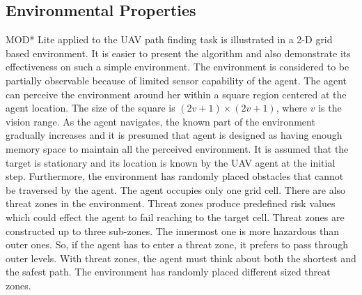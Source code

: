 \documentclass[10pt,journal]{IEEEtran}
\begin{document}
\subsection{Environmental Properties}
\label{envProperties}
MOD* Lite applied to the UAV path finding task is illustrated in a 2-D grid based environment. It is easier to present the algorithm and also demonstrate its effectiveness on such a simple environment. The environment is considered to be partially observable because of limited sensor capability of the agent. The agent can perceive the environment around her within a square region centered at the agent location. The size of the square is $(2v + 1) \times (2v + 1)$, where $v$ is the vision range. As the agent navigates, the known part of the environment gradually increases and it is presumed that agent is designed as having enough memory space to maintain all the perceived environment. It is assumed that the target is stationary and its location is known by the UAV agent at the initial step. Furthermore, the environment has randomly placed obstacles that cannot be traversed by the agent. The agent occupies only one grid cell. There are also threat zones in the environment. Threat zones produce predefined risk values which could effect the agent to fail reaching to the target cell. Threat zones are constructed up to three sub-zones. The innermost one is more hazardous than outer ones. So, if the agent has to enter a threat zone, it prefers to pass through outer levels. With threat zones, the agent must think about both the shortest and the safest path. The environment has randomly placed different sized threat zones.

%
%
\end{document}

